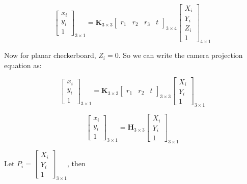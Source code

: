 \documentclass{article}
\begin{document}
\begin{equation}
    \begin{bmatrix}
    x_i \\ y_i \\ 1
    \end{bmatrix}_{3\times1} = \mathbf{K}_{3\times3}
    \begin{bmatrix}
    r_1 & r_2 & r_3 & t
    \end{bmatrix}_{3\times4}
    \begin{bmatrix}
    X_i \\ Y_i \\ Z_i \\1
    \end{bmatrix}_{4\times1}
\end{equation}

Now for planar checkerboard, $Z_i = 0$. So we can write the camera projection equation as:

\begin{equation}
    \begin{bmatrix}
    x_i \\ y_i \\ 1
    \end{bmatrix}_{3\times1} = \mathbf{K}_{3\times3}
    \begin{bmatrix}
    r_1 & r_2 & t
    \end{bmatrix}_{3\times3}
    \begin{bmatrix}
    X_i \\ Y_i \\ 1
    \end{bmatrix}_{3\times1}
\end{equation}

\begin{equation}
    \begin{bmatrix}
    x_i \\ y_i \\ 1
    \end{bmatrix}_{3\times1} = \mathbf{H}_{3\times3}
    \begin{bmatrix}
    X_i \\ Y_i \\ 1
    \end{bmatrix}_{3\times1}
\end{equation}

Let $P_i = \begin{bmatrix} X_i \\ Y_i \\ 1 \end{bmatrix}_{3 \times 1}$, then
\end{document}
